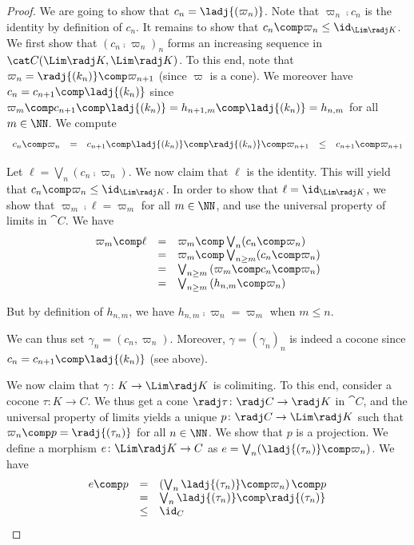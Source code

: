 \begin{proof}
We are going to show that $c_n = \ladj{(\varpi_n)}$.
Note that $\varpi_n \comp c_n$ is the identity by definition of $c_n$.
It remains to show that $c_n \comp \varpi_n \leq \id_{\Lim \radj K}$.
We first show that
$(c_n \comp \varpi_n)_n$ forms an increasing sequence
in $\cat C(\Lim \radj K, \Lim \radj K)$.
To this end, note that $\varpi_n = \radj{(k_n)} \comp \varpi_{n+1}$ 
(since $\varpi$ is a cone).
We moreover have
$c_n = c_{n+1} \comp \ladj{(k_n)}$
since
\(
  \varpi_m \comp c_{n+1} \comp \ladj{(k_n)}
  =
  h_{n+1,m} \comp \ladj{(k_n)}
  =
  h_{n,m}
\)
for all $m \in \NN$.
We compute
\[
\begin{array}{*{5}{l}}
  c_n \comp \varpi_n
& =
& c_{n+1} \comp \ladj{(k_n)} \comp \radj{(k_n)} \comp \varpi_{n+1}
& \leq
& c_{n+1} \comp \varpi_{n+1}
\end{array}
\]

Let $\ell = \bigvee_{n}(c_n \comp \varpi_n)$.
We now claim that $\ell$ is the identity.
This will yield that $c_n \comp \varpi_n \leq \id_{\Lim \radj K}$.
In order to show that $\ell = \id_{\Lim \radj K}$,
we show that $\varpi_m \comp \ell = \varpi_m$ for all $m \in \NN$,
and use the universal property of limits in $\cat C$.
We have
\[
\begin{array}{l l l}
  \varpi_m \comp \ell
& =
& \varpi_m \comp \bigvee_{n}(c_n \comp \varpi_n)
\\
%
& =
& \varpi_m \comp \bigvee_{n \geq m}(c_n \comp \varpi_n)
\\
%
& =
& \bigvee_{n \geq m} \left(
  \varpi_m \comp c_n \comp \varpi_n
  \right)
\\
%
& =
& \bigvee_{n\geq m} \left(
  h_{n,m} \comp \varpi_n
  \right)
\end{array}
\]

\noindent
But by definition of $h_{n,m}$, we have
$h_{n,m} \comp \varpi_n = \varpi_m$ when $m \leq n$.

We can thus set $\gamma_n = (c_n, \varpi_n)$.
Moreover, $\gamma = (\gamma_n)_n$ is indeed a cocone since
$c_n = c_{n+1} \comp \ladj{(k_n)}$ (see above).

We now claim that $\gamma \colon K \to \Lim \radj K$ is colimiting.
To this end, consider a cocone $\tau \colon K \to C$.
We thus get a cone $\radj\tau \colon \radj C \to \radj K$ in $\cat C$,
and the universal property of limits yields a unique
$p \colon \radj C \to \Lim \radj K$ such that
$\varpi_n \comp p = \radj{(\tau_n)}$ for all $n \in \NN$.
We show that $p$ is a projection.
We define a morphism $e \colon \Lim \radj K \to C$
as $e = \bigvee_{n}(\ladj{(\tau_n)} \comp \varpi_n)$.
We have
\[
\begin{array}{l l l}
  e \comp p
& =
& \left( \bigvee_{n} \ladj{(\tau_n)} \comp \varpi_n \right) \comp p
\\
%
& =
& \bigvee_n \ladj{(\tau_n)} \comp \radj{(\tau_n)}
\\
%
& \leq
& \id_{C}
\end{array}
\]


\end{proof}
